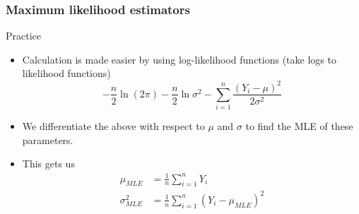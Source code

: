 \documentclass[compress]{beamer}
\begin{document}
\begin{frame}
\frametitle{Maximum likelihood estimators}
Practice
\begin{itemize}
\item Calculation is made easier by using log-likelihood functions (take logs to likelihood functions)
\[
-\frac{n}{2}\ln{(2\pi)}-\frac{n}{2}\ln{\sigma^2}-\sum_{i=1}^n\frac{(Y_i-\mu)^2}{2\sigma^2} 
\]
\item We differentiate the above with respect to $\mu$ and $\sigma$ to find the MLE of these parameters.
\item This gets us
\[
\begin{aligned}
\mu_{MLE}&=\frac{1}{n}\sum_{i=1}^nY_i\\
\sigma^2_{MLE}&=\frac{1}{n}\sum_{i=1}^n(Y_i-\mu_{MLE})^2
\end{aligned}
\]
\end{itemize}
\end{frame}
\end{document}
